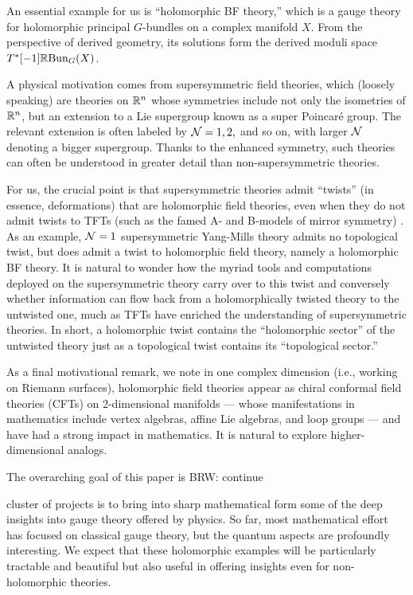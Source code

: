 \documentclass[11pt]{amsart}
\def\owen#1{{\textcolor{green!65!black}{BRW: {#1}}}}
\begin{document}
An essential example for us is ``holomorphic BF theory,''
which is a gauge theory for holomorphic principal $G$-bundles on a complex manifold $X$.
From the perspective of derived geometry, its solutions form the derived moduli space~$T^*[-1] \mathbb R{\rm Bun}_G(X)$. 

A physical motivation comes from supersymmetric field theories, 
which (loosely speaking) are theories on $\mathbb R^n$ whose symmetries include not only the isometries of $\mathbb R^n$, but an extension to a Lie supergroup known as a super Poincar\'e group.
The relevant extension is often labeled by $\mathcal N=1, 2,$ and so on, 
with larger $\mathcal N$ denoting a bigger supergroup. 
Thanks to the enhanced symmetry, such theories can often be understood in greater detail than non-supersymmetric theories.

For us, the crucial point is that supersymmetric theories admit ``twists'' (in essence, deformations) that are holomorphic field theories, 
even when they do not admit twists to TFTs (such as the famed A- and B-models of mirror symmetry) \cite{CosHol}.
As an example, $\mathcal N=1$ supersymmetric Yang-Mills theory admits no topological twist, but does admit a twist to holomorphic field theory, namely a holomorphic BF theory.
It is natural to wonder how the myriad tools and computations deployed on the supersymmetric theory carry over to this twist and conversely whether information can flow back from a holomorphically twisted theory to the untwisted one, 
much as TFTs have enriched the understanding of supersymmetric theories.
In short, a holomorphic twist contains the ``holomorphic sector'' of the untwisted theory just as a topological twist contains its ``topological sector.''

As a final motivational remark, we note in one complex dimension (i.e., working on Riemann surfaces), holomorphic field theories appear as chiral conformal field theories (CFTs) on 2-dimensional manifolds --- whose manifestations in mathematics include vertex algebras, affine Lie algebras, and loop groups --- and have had a strong impact in mathematics.
It is natural to explore higher-dimensional analogs.

The overarching goal of this paper is \owen{continue}


cluster of projects is to bring into sharp mathematical form some of the deep insights into gauge theory offered by physics.
So far, most mathematical effort has focused on classical gauge theory,
but the quantum aspects are profoundly interesting.
We expect that these holomorphic examples will be particularly tractable and beautiful but also useful in offering insights even for non-holomorphic theories.
\end{document}
